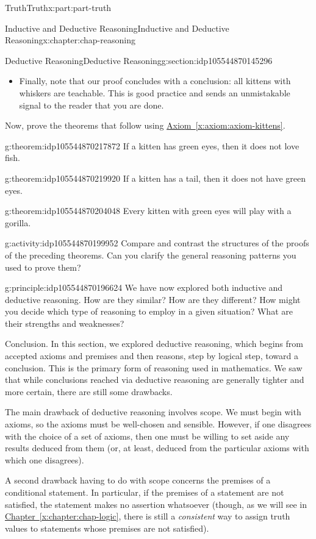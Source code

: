 \documentclass[oneside,10pt,]{book}
\newcommand{\xreffont}{\relax}
\numberwithin{equation}{section}
\begin{document}
\begin{partptx}{Truth}{}{Truth}{}{}{x:part:part-truth}
\begin{chapterptx}{Inductive and Deductive Reasoning}{}{Inductive and Deductive Reasoning}{}{}{x:chapter:chap-reasoning}
\begin{sectionptx}{Deductive Reasoning}{}{Deductive Reasoning}{}{}{g:section:idp105544870145296}
\begin{itemize}[label=\textbullet]
\item{}Finally, note that our proof concludes with a conclusion: all kittens with whiskers are teachable. This is good practice and sends an unmistakable signal to the reader that you are done.%
\end{itemize}
Now, prove the theorems that follow using \hyperref[x:axiom:axiom-kittens]{Axiom~{\xreffont\ref{x:axiom:axiom-kittens}}}.%
\begin{theorem}{}{}{g:theorem:idp105544870217872}%
If a kitten has green eyes, then it does not love fish.%
\end{theorem}
\begin{theorem}{}{}{g:theorem:idp105544870219920}%
If a kitten has a tail, then it does not have green eyes.%
\end{theorem}
\begin{theorem}{}{}{g:theorem:idp105544870204048}%
Every kitten with green eyes will play with a gorilla.%
\end{theorem}
\begin{activity}{}{g:activity:idp105544870199952}%
Compare and contrast the structures of the proofs of the preceding theorems. Can you clarify the general reasoning patterns you used to prove them?%
\end{activity}%
\begin{principle}{}{}{g:principle:idp105544870196624}%
We have now explored both inductive and deductive reasoning. How are they similar? How are they different? How might you decide which type of reasoning to employ in a given situation? What are their strengths and weaknesses?%
\end{principle}
\begin{conclusion}{Conclusion.}%
In this section, we explored deductive reasoning, which begins from accepted axioms and premises and then reasons, step by logical step, toward a conclusion. This is the primary form of reasoning used in mathematics. We saw that while conclusions reached via deductive reasoning are generally tighter and more certain, there are still some drawbacks.%
\par
The main drawback of deductive reasoning involves scope. We must begin with axioms, so the axioms must be well-chosen and sensible. However, if one disagrees with the choice of a set of axioms, then one must be willing to set aside any results deduced from them (or, at least, deduced from the particular axioms with which one disagrees).%
\par
A second drawback having to do with scope concerns the premises of a conditional statement. In particular, if the premises of a statement are not satisfied, the statement makes no assertion whatsoever (though, as we will see in \hyperref[x:chapter:chap-logic]{Chapter~{\xreffont\ref{x:chapter:chap-logic}}}, there is still a \emph{consistent} way to assign truth values to statements whose premises are not satisfied).%

\end{conclusion}
\end{sectionptx}
\end{chapterptx}
\end{partptx}
\end{document}
